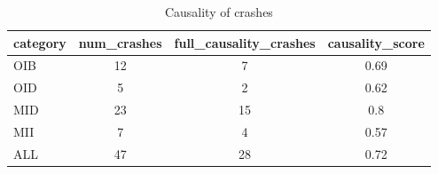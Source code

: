 \begin{table}[ht]
\centering
\renewcommand{\arraystretch}{1.06}
\setlength{\tabcolsep}{4pt}
\begin{tabular}{|l||c|c|c|}
\hline
{\sc category} & {\sc num\_crashes} & {\sc full\_causality\_crashes} & {\sc causality\_score} \\
\toprule
\hline
OIB & 12 & 7 & 0.69 \\
\hline
OID & 5 & 2 & 0.62 \\
\hline
MID & 23 & 15 & 0.8 \\
\hline
MII & 7 & 4 & 0.57 \\
\hline
ALL & 47 & 28 & 0.72 \\
\hline
\end{tabular}
\caption{Causality of crashes}
\end{table}
